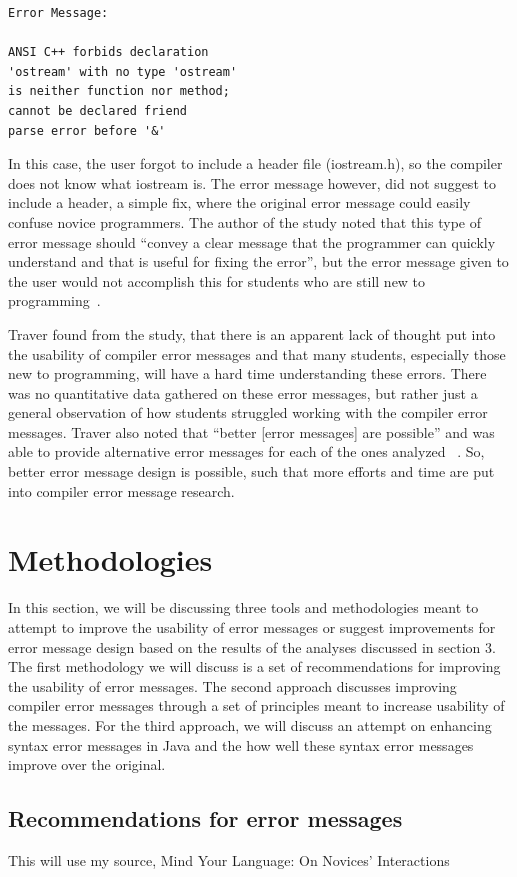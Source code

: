 \documentclass{sig-alternate}
\begin{document}
\begin{verbatim}
Error Message:

ANSI C++ forbids declaration 
'ostream' with no type 'ostream'
is neither function nor method; 
cannot be declared friend
parse error before '&'
\end{verbatim}

In this case, the user forgot to include a header file (iostream.h), so the compiler does not know what iostream is.
The error message however, did not suggest to include a header, a simple fix, where the original error message could easily confuse novice programmers.
The author of the study noted that this type of error message should ``convey a clear message that the programmer can quickly understand and that is useful for fixing the error'', but the error message given to the user would not accomplish this for students who are still new to programming~\cite{Traver:2010}.

Traver found from the study, that there is an apparent lack of thought put into the usability of compiler error messages and that many students, especially those new to programming, will have a hard time understanding these errors.
There was no quantitative data gathered on these error messages, but rather just a general observation of how students struggled working with the compiler error messages.
Traver also noted that ``better [error messages] are possible'' and was able to provide alternative error messages for each of the ones analyzed ~\cite{Traver:2010}.
So, better error message design is possible, such that more efforts and time are put into compiler error message research. 

\section{Methodologies}
In this section, we will be discussing three tools and methodologies meant to attempt to improve the usability of error messages or suggest improvements for error message design based on the results of the analyses discussed in section 3.
The first methodology we will discuss is a set of recommendations for improving the usability of error messages.
The second approach discusses improving compiler error messages through a set of principles meant to increase usability of the messages.
For the third approach, we will discuss an attempt on enhancing syntax error messages in Java and the how well these syntax error messages improve over the original. 

\subsection{Recommendations for error messages}
This will use my source, Mind Your Language: On Novices' Interactions 
\end{document}
